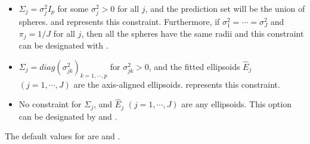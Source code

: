 \begin{itemize}
    \item $\Sigma_j=\sigma^2_jI_p$ for some $\sigma^2_j>0$ for all $j$, and the prediction set will be the union of spheres.  and  represents this constraint. Furthermore, if $\sigma^2_1 = \cdots = \sigma^2_J$ and $\pi_j = 1/J$ for all $j$, then all the spheres have the same radii and this constraint can be designated with .
    \item $\Sigma_j = diag\left(\sigma^2_{jk}\right)_{k=1,\cdots,p}$ for $\sigma^2_{jk}>0$, and the fitted ellipsoids $\hat{E}_j$ $(j=1,\cdots,J)$ are the axis-aligned ellipsoids.  represents this constraint.
    \item No constraint for $\Sigma_j$, and $\hat{E}_j$ $(j=1,\cdots,J)$ are any ellipsoids. This option can be designated by  and . %
\end{itemize}

The default values for  are  and .




